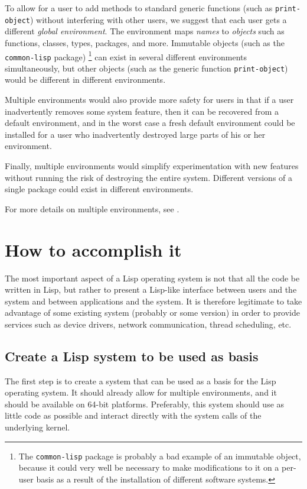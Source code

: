 To allow for a user to add methods to standard generic functions (such
as \texttt{print-object}) without interfering with other users, we
suggest that each user gets a different \emph{global environment}.
The environment maps \emph{names} to \emph{objects} such as functions,
classes, types, packages, and more.  Immutable objects (such as the
\texttt{common-lisp} package)%
\footnote{The \texttt{common-lisp} package is probably a bad example
  of an immutable object, because it could very well be necessary to
  make modifications to it on a per-user basis as a result of the
  installation of different software systems.}
can exist in several different
environments simultaneously, but other objects (such as the generic
function \texttt{print-object}) would be different in different
environments.

Multiple environments would also provide more safety for users in
that if a user inadvertently removes some system feature, then it
can be recovered from a default environment, and in the worst case a
fresh default environment could be installed for a user who
inadvertently destroyed large parts of his or her environment. 

Finally, multiple environments would simplify experimentation with
new features without running the risk of destroying the entire
system.  Different versions of a single package could exist in
different environments.

For more details on multiple environments, see
.

\section{How to accomplish it}

The most important aspect of a Lisp operating system is not that all
the code be written in Lisp, but rather to present a Lisp-like
interface between users and the system and between applications and
the system.  It is therefore legitimate to take advantage of some
existing system (probably \linux{} or some \bsd{} version) in order to
provide services such as device drivers, network communication, thread
scheduling, etc.

\subsection{Create a Lisp system to be used as basis}

The first step is to create a \cl{} system that can be used as a basis
for the Lisp operating system.  It should already allow for multiple
environments, and it should be available on 64-bit platforms.
Preferably, this system should use as little \clanguage{} code as
possible and interact directly with the system calls of the underlying
kernel.

